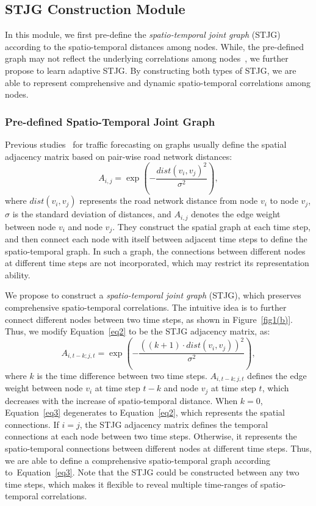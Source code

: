 \documentclass[10pt,journal,compsoc]{IEEEtran}
\begin{document}
\subsection{STJG Construction Module} \label{STJG Construction Module}

In this module, we first pre-define the \textit{spatio-temporal joint graph} (STJG) according to the spatio-temporal distances among nodes. While, the pre-defined graph may not reflect the underlying correlations among nodes~\cite{Wu-et-al:IJCAI2019,Bai-et-al:NIPS2020}, we further propose to learn adaptive STJG. By constructing both types of STJG, we are able to represent comprehensive and dynamic spatio-temporal correlations among nodes.

\subsubsection{Pre-defined Spatio-Temporal Joint Graph}

Previous studies~\cite{Li-et-al:ICLR2018,Yu-et-al:IJCAI2018} for traffic forecasting on graphs usually define the spatial adjacency matrix based on pair-wise road network distances:
%
\begin{equation}
A_{i,j}=\exp(-\frac{{dist(v_{i},v_{j})}^2}{\sigma^2})
\label{eq2},
\end{equation}
%
where $ dist(v_{i},v_{j}) $ represents the road network distance from node $ v_{i} $ to node $ v_{j} $, $ \sigma $ is the standard deviation of distances, and $ A_{i,j} $ denotes the edge weight between node $ v_i $ and node $ v_j $. They construct the spatial graph at each time step, and then connect each node with itself between adjacent time steps to define the spatio-temporal graph. In such a graph, the connections between different nodes at different time steps are not incorporated, which may restrict its representation ability. 

We propose to construct a \textit{spatio-temporal joint graph} (STJG), which preserves comprehensive spatio-temporal correlations. The intuitive idea is to further connect different nodes between two time steps, as shown in Figure~\ref{fig1(b)}. Thus, we modify Equation~\ref{eq2} to be the STJG adjacency matrix, as:
%
\begin{equation}
A_{i,t-k;j,t}=\exp(-\frac{{((k + 1) \cdot dist(v_{i},v_{j}))}^2}{\sigma^2})
\label{eq3},
\end{equation}
%
where $ k $ is the time difference between two time steps. $ A_{i,t-k;j,t} $ defines the edge weight between node $ v_i $ at time step $ t-k $ and node $ v_j $ at time step $ t $, which decreases with the increase of spatio-temporal distance. When $ k=0 $, Equation~\ref{eq3} degenerates to Equation~\ref{eq2}, which represents the spatial connections. If $ i=j $, the STJG adjacency matrix defines the temporal connections at each node between two time steps. Otherwise, it represents the spatio-temporal connections between different nodes at different time steps. Thus, we are able to define a comprehensive spatio-temporal graph according to~Equation~\ref{eq3}. Note that the STJG could be constructed between any two time steps, which makes it flexible to reveal multiple time-ranges of spatio-temporal correlations. 
\end{document}
